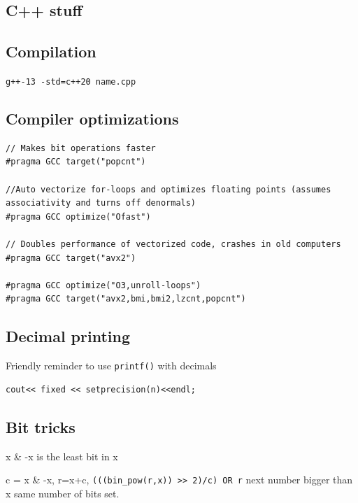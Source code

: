 \documentclass[10pt]{article}
\begin{document}
\begin{multicols*}{2}
\section{C++ stuff}

\subsection{Compilation}

\texttt{g++-13 -std=c++20 name.cpp}

\subsection{Compiler optimizations}


\begin{lstlisting}[style=compactcpp]
// Makes bit operations faster
#pragma GCC target("popcnt") 

//Auto vectorize for-loops and optimizes floating points (assumes associativity and turns off denormals)
#pragma GCC optimize("Ofast")

// Doubles performance of vectorized code, crashes in old computers
#pragma GCC target("avx2")

#pragma GCC optimize("O3,unroll-loops")
#pragma GCC target("avx2,bmi,bmi2,lzcnt,popcnt")
\end{lstlisting}

\subsection{Decimal printing}

Friendly reminder to use \texttt{printf()} with decimals

\begin{lstlisting}[style=compactcpp]
cout<< fixed << setprecision(n)<<endl;
\end{lstlisting}

\subsection{Bit tricks}

x \& -x is the least bit in x

c = x \& -x, r=x+c, \texttt{(((bin\_pow(r,x)) >> 2)/c) OR r}  next number bigger than x same number of bits set.

\end{multicols*}
\end{document}
